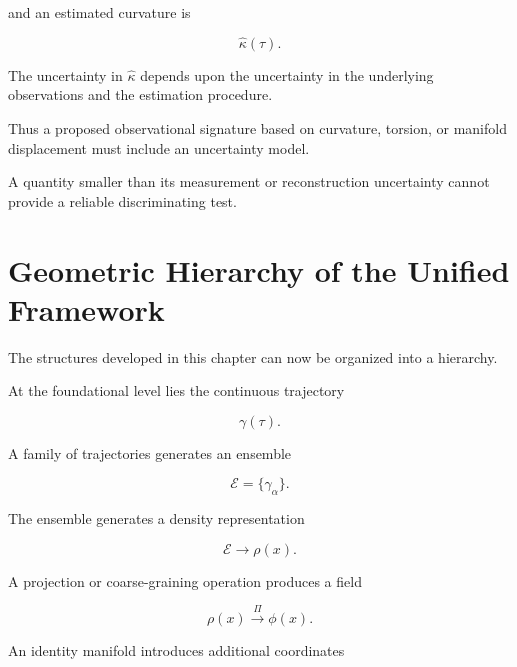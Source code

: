 \documentclass[12pt,oneside]{book}
\begin{document}
and an estimated curvature is

\begin{equation}
    \widehat{\kappa}(\tau).
\end{equation}

The uncertainty in \(\widehat{\kappa}\) depends upon the
uncertainty in the underlying observations and the estimation
procedure.

Thus a proposed observational signature based on curvature,
torsion, or manifold displacement must include an uncertainty
model.

A quantity smaller than its measurement or reconstruction
uncertainty cannot provide a reliable discriminating test.


\section{Geometric Hierarchy of the Unified Framework}
\label{sec:geometric-hierarchy-framework}

The structures developed in this chapter can now be organized
into a hierarchy.

At the foundational level lies the continuous trajectory

\begin{equation}
    \gamma(\tau).
\end{equation}

A family of trajectories generates an ensemble

\begin{equation}
    \mathscr{E}
    =
    \{\gamma_\alpha\}.
\end{equation}

The ensemble generates a density representation

\begin{equation}
    \mathscr{E}
    \longrightarrow
    \rho(x).
\end{equation}

A projection or coarse-graining operation produces a field

\begin{equation}
    \rho(x)
    \xrightarrow{\Pi}
    \phi(x).
\end{equation}

An identity manifold introduces additional coordinates
\end{document}
